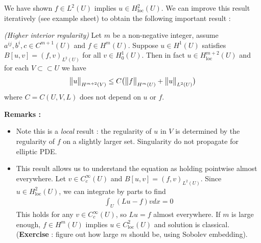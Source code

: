 \documentclass[12pt,a4paper]{report}
\begin{document}
We have shown $f\in L^2(U)$ implies $u\in H^2_{\text{loc}}(U)$. We can improve this result iteratively (see example sheet) to obtain the following important result :
\s

\thm \emph{(Higher interior regularity)} Let $m$ be a non-negative integer, assume $a^{ij},b^{i}, c\in C^{m+1}(U)$ and $f\in H^m (U)$. Suppose $u\in H^1(U)$ satisfies $B[u,v] = (f,v)_{L^2(U)}$ for all $v\in H_0^1(U)$. Then in fact $u\in H^{m+2}_{\text{loc}}(U)$ and for each $V\subset\subset U$ we have
\begin{align*}
\bigl\lVert u\bigr\rVert_{H^{m+2}(V)} \leq C \big( \bigl\lVert f\bigr\rVert_{H^m(U)} + \bigl\lVert u\bigr\rVert_{L^2(U)} \big)
\end{align*}
where $C= C(U,V,L)$ does not depend on $u$ or $f$.
\s

\textbf{Remarks :}
\begin{itemize}
\item Note this is a \emph{local} result : the regularity of $u$ in $V$ is determined by the regularity of $f$ on a slightly larger set. Singularity do not propagate for elliptic PDE.
\item This result allows us to understand the equation as holding pointwise almost everywhere. Let $v\in C_c^{\infty}(U)$ and $B[u,v] = (f,v)_{L^2(U)}$. Since $u\in H^2_{\text{loc}}(U)$, we can integrate by parts to find
\begin{align*}
\int_U (Lu -f) v dx = 0
\end{align*}
This holds for any $v\in C_c^{\infty}(U)$, so $Lu = f$ almost everywhere. If $m$ is large enough, $f\in H^m(U)$ implies $u\in C^2_{\text{loc}}(U)$ and solution is classical. (\textbf{Exercise} : figure out how large $m$ should be, using Sobolev embedding).
\end{itemize}
\s
\end{document}
